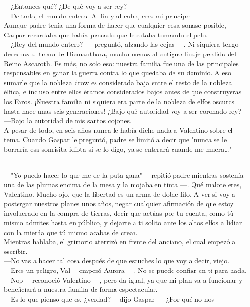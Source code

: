\documentclass[
  letterpaper,
]{krantz}
\begin{document}
---¿Entonces qué? ¿De qué voy a ser rey?\\
---De todo, el mundo entero. Al fin y al cabo, eres mi príncipe.\\
Aunque padre tenía una forma de hacer que cualquier cosa sonase posible,
Gaspar recordaba que había pensado que le estaba tomando el pelo.\\
---¿Rey del mundo entero? --- preguntó, alzando las cejas ---. Ni
siquiera tengo derechos al trono de Diamanthora, mucho menos al antiguo
linaje perdido del Reino Ascaroth. Es más, no solo eso: nuestra familia
fue una de las principales responsables en ganar la guerra contra lo que
quedaba de su dominio. A eso sumarle que la nobleza drow es considerada
baja entre el resto de la nobleza élfica, e incluso entre ellos éramos
considerados bajos antes de que construyeras los Faros. ¡Nuestra familia
ni siquiera era parte de la nobleza de elfos oscuros hasta hace unas
seis generaciones! ¿Bajo qué autoridad voy a ser coronado rey?\\
---Bajo la autoridad de mis santos cojones.\\
A pesar de todo, en seis años nunca le había dicho nada a Valentino
sobre el tema. Cuando Gaspar le preguntó, padre se limitó a decir que
"nunca se le borraría esa sonrisita idiota si se lo digo, ya se enterará
cuando me muera\ldots"\\
\strut \\
---"Yo puedo hacer lo que me de la puta gana" ---repitió padre mientras
sostenía una de las plumas encima de la mesa y la mojaba en tinta ---.
Qué malote eres, Valentino. Mucho ojo, que la libertad es un arma de
doble filo. A ver si voy a postergar nuestros planes unos años, negar
cualquier afirmación de que estoy involucrado en la compra de tierras,
decir que actúas por tu cuenta, como tú mismo admites hasta en público,
y dejarte a ti solito ante los altos elfos a lidiar con la mierda que tú
mismo acabas de crear.\\
Mientras hablaba, el grimorio aterrizó en frente del anciano, el cual
empezó a escribir.\\
---No vas a hacer tal cosa después de que escuches lo que voy a decir,
viejo.\\
---Eres un peligro, Val ---empezó Aurora ---. No se puede confiar en ti
para nada.\\
---Nop ---reconoció Valentino ---, pero da igual, ya que mi plan va a
funcionar y beneficiará a nuestra familia de forma espectacular.\\
---Es lo que pienso que es, ¿verdad? ---dijo Gaspar --- ¿Por qué no nos
\end{document}
